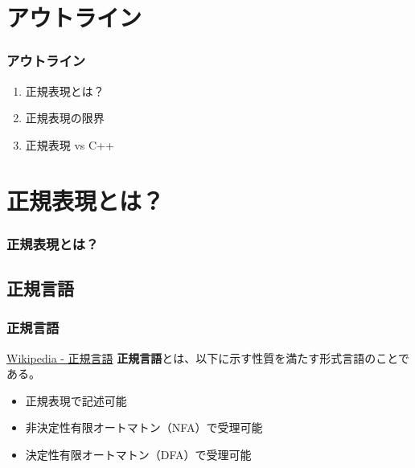 \documentclass[12pt, unicode, svgnames]{beamer}
\begin{document}
\section{アウトライン}
\begin{frame}[fragile]
  \frametitle{アウトライン}

  \begin{enumerate}
    \item<2-> 正規表現とは？
    \item<3-> 正規表現の限界
    \item<4-> 正規表現 vs C++
  \end{enumerate}
\end{frame}

\section{正規表現とは？}
\begin{frame}[fragile]
  \frametitle{正規表現とは？}


\end{frame}

\subsection{正規言語}
\begin{frame}[fragile]
  \frametitle{正規言語}

  \begin{block}{}
    \begin{shadequote}[r]{\scriptsize\href{https://ja.wikipedia.org/wiki/\%E6\%AD\%A3\%E8\%A6\%8F\%E8\%A8\%80\%E8\%AA\%9E}{Wikipedia - 正規言語}}
      \textbf{正規言語}とは、以下に示す性質を満たす形式言語のことである。
      \begin{itemize}
        \item<2-> 正規表現で記述可能
        \item<3-> 非決定性有限オートマトン（NFA）で受理可能
        \item<4-> 決定性有限オートマトン（DFA）で受理可能
      \end{itemize}
    \end{shadequote}
  \end{block}
\end{frame}
\end{document}
